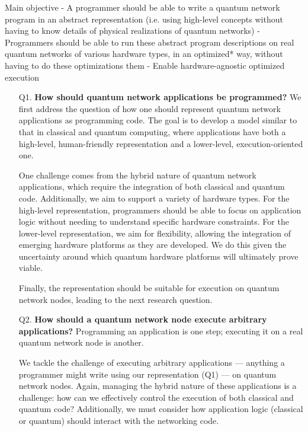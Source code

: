 Main objective
- A programmer should be able to write a quantum network program in an abstract representation (i.e. using high-level concepts without having to know details of physical realizations of quantum networks)
- Programmers should be able to run these abstract program descriptions on real quantum networks of various hardware types, in an optimized* way, without having to do these optimizations them
- Enable hardware-agnostic optimized execution


\begin{itemize}
  \item[Q1.] \textbf{How should quantum network applications be programmed?}
    We first address the question of how one should represent quantum network applications as programming code.
    The goal is to develop a model similar to that in classical and quantum computing, where applications have both a high-level, human-friendly representation and a lower-level, execution-oriented one.

    One challenge comes from the hybrid nature of quantum network applications, which require the integration of both classical and quantum code.
    Additionally, we aim to support a variety of hardware types.
    For the high-level representation, programmers should be able to focus on application logic without needing to understand specific hardware constraints.
    For the lower-level representation, we aim for flexibility, allowing the integration of emerging hardware platforms as they are developed.
    We do this given the uncertainty around which quantum hardware platforms will ultimately prove viable.

    Finally, the representation should be suitable for execution on quantum network nodes, leading to the next research question.

  \item[Q2.] \textbf{How should a quantum network node execute arbitrary applications?}
    Programming an application is one step; executing it on a real quantum network node is another.

    We tackle the challenge of executing arbitrary applications --- anything a programmer might write using our representation (Q1) --- on quantum network nodes.
    Again, managing the hybrid nature of these applications is a challenge: how can we effectively control the execution of both classical and quantum code?
    Additionally, we must consider how application logic (classical or quantum) should interact with the networking code.
    

\end{itemize}
